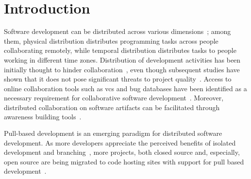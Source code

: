 \documentclass{sig-alternate}
\begin{document}


\section{Introduction}

%


Software development can be distributed across various
dimensions~\cite{Gumm06}; among them, physical distribution distributes
programming tasks across people collaborating remotely, while temporal
distribution distributes tasks to people working in different time zones.
Distribution of development activities has been initially thought to hinder
collaboration~\cite{Herbs99, Batti01}, even though subsequent studies have
shown that it does not pose significant threats to project
quality~\cite{Spine06, Nguye08, Bird09a}. Access to online collaboration tools
such as {\sc vcs} and bug databases have been identified as a necessary
requirement for collaborative software development~\cite{Knuds76,Pilat06,
Catal06}. Moreover, distributed collaboration on software artifacts can be
facilitated through awareness building tools~\cite{Dabbi12, Treud12, Lanza10}. 

Pull-based development is an emerging paradigm for distributed software
development. As more developers appreciate the perceived benefits of isolated
development and branching~\cite{Bird12}, more projects, both closed source and,
especially, open source are being migrated to code hosting sites with support
for pull based development~\cite{Barr12}.
\end{document}

